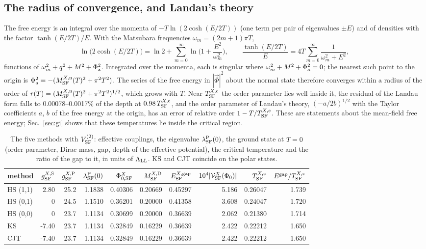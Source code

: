 \documentclass[aps,prd,onecolumn,superscriptaddress,nofootinbib,floatfix,longbibliography]{revtex4-2}
\newcommand{\LL}{{\rm LL}}
\newcommand{\SF}{{\rm SF}}
\begin{document}
\subsection{The radius of convergence, and Landau's theory}

The free energy is an integral over the momenta of $-T\ln(2\cosh(E/2T))$ (one term per pair of eigenvalues $\pm E$) and of
densities with the factor $\tanh(E/2T)/E$. With the Matsubara frequencies $\omega_m=(2m+1)\pi T$,
\begin{equation}
\ln\big(2\cosh(E/2T)\big)=\ln2+\sum_{m=0}^\infty\ln\Big(1+\frac{E^2}{\omega_m^2}\Big),\qquad\frac{\tanh(E/2T)}{E}=4T\sum_{m=0}^\infty\frac1{\omega_m^2+E^2},
\label{eq:matsubara}
\end{equation}
functions of $\omega_m^2+q^2+M^2+\Phi_{\rm a}^2$. Integrated over the momenta, each is singular where $\omega_m^2+M^2+\Phi_{\rm a}^2=0$; the
nearest such point to the origin is $\Phi_{\rm a}^2=-(M^{X,{\rm n}}_\SF(T)^2+\pi^2T^2)$. The series of the free energy in $|\vec\Phi|^2$ about the
normal state therefore converges within a radius of the order of $r(T)=(M^{X,{\rm n}}_\SF(T)^2+\pi^2T^2)^{1/2}$, which grows with $T$.
Near $T^{X,{\rm c}}_\SF$ the order parameter lies well inside it, the residual of the Landau form falls to 0.00078\mbox{--}0.0017\% of the depth
at $0.98\,T^{X,{\rm c}}_\SF$, and the order parameter of Landau's theory, $(-a/2b)^{1/2}$ with the Taylor coefficients $a$, $b$ of
the free energy at the origin, has an error of relative order $1-T/T^{X,{\rm c}}_\SF$. These are statements about the mean-field free
energy; Sec.~\ref{sec:gi} shows that these temperatures lie inside the critical region.

\begin{table}[h]
\caption{\label{tab:T0}The five methods with $V^{(2)}_\SF$: effective couplings, the eigenvalue $\lambda^{\rm P}_\SF(0)$, the ground state at
$T=0$ (order parameter, Dirac mass, gap, depth of the effective potential), the critical temperature and the ratio of the gap
to it, in units of $\Lambda_\LL$. KS and CJT coincide on the polar states.}
\begin{ruledtabular}
\begin{tabular}{lrrrrrrrrr}
method & $g^{X,{\rm S}}_\SF$ & $g^{X,{\rm P}}_\SF$ & $\lambda^{\rm P}_\SF(0)$ & $\Phi^X_{0,\SF}$ & $M^{X,{\rm D}}_\SF$ & $E^{X,{\rm gap}}_\SF$ & $10^4|\mathcal V^X_\SF(\Phi_0)|$ & $T^{X,{\rm c}}_\SF$ & $E^{\rm gap}/T^{X,{\rm c}}_\SF$ \\
\hline
HS (1,1) & 2.80 & 25.2 & 1.1838 & 0.40306 & 0.20669 & 0.45297 & 5.186 & 0.26047 & 1.739 \\
HS (0,1) & 0 & 24.5 & 1.1510 & 0.36201 & 0.20000 & 0.41358 & 3.608 & 0.24047 & 1.720 \\
HS (0,0) & 0 & 23.7 & 1.1134 & 0.30699 & 0.20000 & 0.36639 & 2.062 & 0.21380 & 1.714 \\
KS & -7.40 & 23.7 & 1.1134 & 0.32849 & 0.16229 & 0.36639 & 2.422 & 0.22212 & 1.650 \\
CJT & -7.40 & 23.7 & 1.1134 & 0.32849 & 0.16229 & 0.36639 & 2.422 & 0.22212 & 1.650 \\
\end{tabular}
\end{ruledtabular}
\end{table}
\end{document}
